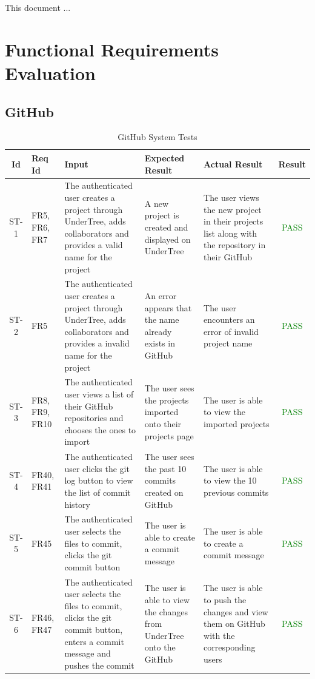 \documentclass[12pt, titlepage]{article}
\begin{document}
	\tableofcontents
	
	\listoftables %
	
	\listoffigures %
	
	\newpage
	
	
	This document ...
	
	\section{Functional Requirements Evaluation}
	
	\subsection{GitHub}
	\begin{center}
		\begin{longtable}{|c|p{1cm}|p{2.7cm}|p{3cm}|p{3cm}|c|}
			\caption{GitHub System Tests \label{long}}\\
			\hline
			\textbf{Id} & \textbf{Req Id} & \textbf{Input} & \textbf{Expected Result} & \textbf{Actual Result} & \textbf{Result}   \\
			\hline
			ST-1 & FR5, FR6, FR7 & The authenticated user creates a project through UnderTree, adds collaborators and provides a valid name for the project & A new project is created and displayed on UnderTree & The user views the new project in their projects list along with the repository in their GitHub & \textcolor{green}{PASS} \\
			\hline
			ST-2 & FR5 & The authenticated user creates a project through UnderTree, adds collaborators and provides a invalid name for the project & An error appears that the name already exists in GitHub & The user encounters an error of invalid project name & \textcolor{green}{PASS} \\
			\hline
			ST-3 & FR8, FR9, FR10 & The authenticated user views a list of their GitHub repositories and chooses the ones to import & The user sees the projects imported onto their projects page & The user is able to view the imported projects & \textcolor{green}{PASS} \\
			\hline
			ST-4 & FR40, FR41 & The authenticated user clicks the git log button to view the list of commit history & The user sees the past 10 commits created on GitHub & The user is able to view the 10 previous commits & \textcolor{green}{PASS} \\
			\hline
			ST-5 & FR45 & The authenticated user selects the files to commit, clicks the git commit button & The user is able to create a commit message & The user is able to create a commit message & \textcolor{green}{PASS} \\
			\hline
			ST-6 & FR46, FR47 & The authenticated user selects the files to commit, clicks the git commit button, enters a commit message and pushes the commit & The user is able to view the changes from UnderTree onto the GitHub & The user is able to push the changes and view them on GitHub with the corresponding users & \textcolor{green}{PASS} \\
			\hline
		\end{longtable}
	\end{center}
	
\end{document}
